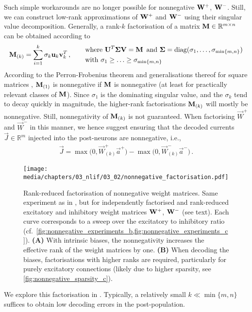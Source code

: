 Such simple workarounds are no longer possible for nonnegative $\mathbf{W}^+$, $\mathbf{W}^-$.
Still, we can construct low-rank approximations of $\mathbf{W}^+$ and $\mathbf{W}^-$ using their singular value decomposition.
Generally, a rank-$k$ factorisation of a matrix $\mathbf{M} \in \mathbb{R}^{m \times n}$ can be obtained according to
\begin{align}
	\mathbf{M}_{(k)} = \sum_{i = 1}^k \sigma_k \mathbf{u}_k \mathbf{v}_k^T \,, \quad\quad
	\begin{aligned}	
		&\text{where } \mathbf{U}^T \mathbf{\Sigma} \mathbf{V} = \mathbf{M} \,
		\text{ and } \mathbf{\Sigma} = \mathrm{diag}(\sigma_1, \ldots, \sigma_{\min\{m, n\}}) \\
		&\text{with }
	\sigma_1 \geq \ldots \geq \sigma_{\min\{m, n\}}
	\end{aligned}
	\label{eqn:svd_factorisation}
\end{align}
According to the Perron-Frobenius theorem and generalisations thereof for square matrices \citep{avin2013generalized}, $\mathbf{M}_{(1)}$ is nonnegative if $\mathbf{M}$ is nonnegative (at least for practically relevant classes of $\mathbf{M}$).
Since $\sigma_1$ is the dominating singular value, and the $\sigma_k$ tend to decay quickly in magnitude, the higher-rank factorisations $\mathbf{M}_{(k)}$ will mostly be nonnegative. Still, nonnegativity of $\mathbf{M}_{(k)}$ is not guaranteed.
When factorising $\vec W^+$ and $\vec W^-$ in this manner, we hence suggest ensuring that the decoded currents $\vec J \in \mathbb{R}^{m}$ injected into the post-neurons are nonnegative, i.e.,
\begin{align*}
	\vec J = \max\bigl(0, \vec W^+_{(k)} \vec a^+ \bigr) - \max\bigl(0, \vec W^-_{(k)} \vec a^- \bigr) \,.
\end{align*}%
\begin{figure}
	\texttt{[image: media/chapters/03\_nlif/03\_02/nonnegative\_factorisation.pdf]}
	\caption[Rank-reduced factorisation of nonnegative weight matrices]{Rank-reduced factorisation of nonnegative weight matrices. Same experiment as in , but for independently factorised and rank-reduced excitatory and inhibitory weight matrices $\mathbf{W}^+$, $\mathbf{W}^-$ (see text). Each curve corresponds to a sweep over the excitatory to inhibitory ratio (cf.~\cref{fig:nonnegative_experiments_b,fig:nonnegative_experiments_c}).
	\textbf{(A)} With intrinsic biases, the nonnegativity increases the effective rank of the weight matrices by one.
	\textbf{(B)} When decoding the biases, factorisations with higher ranks are required, particularly for purely excitatory connections (likely due to higher sparsity, see \cref{fig:nonnegative_sparsity_c}).}
	\label{fig:nonnegative_factorisation}
\end{figure}%
We explore this factorisation in .
Typically, a relatively small $k \ll \min\{m, n\}$ suffices to obtain low decoding errors in the post-population.

